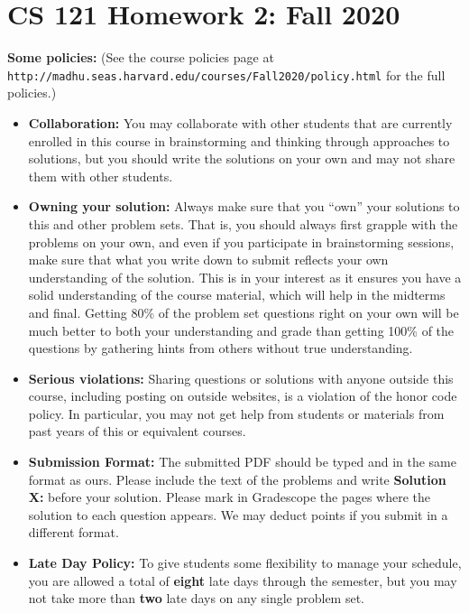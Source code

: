 \documentclass[11pt]{article}
\begin{document}
	
	\section*{CS 121 Homework 2: Fall
		2020}\label{cs-121-homework-zero-fall-2020}

	\textbf{Some policies:} (See the course policies page at \\ {\tt http://madhu.seas.harvard.edu/courses/Fall2020/policy.html} for the
	full policies.)
	
	\begin{itemize}
		\item 
		{\bf Collaboration:} You may collaborate with other   students that are currently enrolled in
		this course 
		in brainstorming and thinking through approaches to
		solutions, but you should write the solutions on your own and may not
		share them with other students. 
		\item
		{\bf Owning your solution:} Always make sure that you ``own'' your solutions to this and other problem
		sets. That is, you should always first grapple with the problems on
		your own, and even if you participate in brainstorming sessions, make
		sure that what you write down to submit reflects your own understanding of the solution.
		This is in your interest as it ensures you have a solid
		understanding of the course material, which will help in the midterms
		and final. Getting 80\% of the problem
		set questions right on your own will be much better to both your
		understanding and grade than getting 100\% of the questions by
		gathering hints from others without true understanding.
		\item
		{\bf Serious violations:} Sharing questions or solutions with anyone outside this course,
		including posting on outside websites, is a violation of the honor
		code policy. In particular, you may not get help from students or materials from past years of 			
		this or equivalent courses.
		\item
		{\bf Submission Format:} The submitted PDF should be typed and in the same format as 
		ours. Please include the text of the problems and write
		\textbf{Solution X:} before your solution. Please mark in Gradescope 
		the pages where
		the solution to each question appears. We may deduct points if you
		submit in a different format.
		\item {\bf Late Day Policy:} To give students some flexibility to manage your schedule, you are allowed a total of {\bf eight} late days through the semester, but you may not take more than {\bf two} late days on any single problem set. 
	\end{itemize}
	
\end{document}
